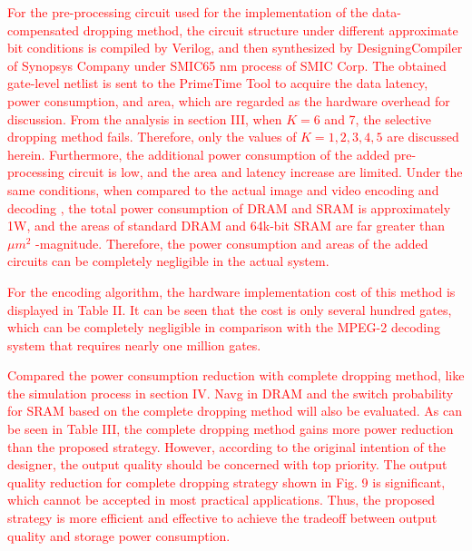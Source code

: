 \documentclass[lettersize,journal]{IEEEtran}
\begin{document}
\textcolor{red}{For the pre-processing circuit used for the implementation of the data-compensated dropping method, the circuit structure under different approximate bit conditions is compiled by Verilog, and then synthesized by DesigningCompiler of Synopsys Company under SMIC65 nm process of SMIC Corp. The obtained gate-level netlist is sent to the PrimeTime Tool to acquire the data latency, power consumption, and area, which are regarded as the hardware overhead for discussion. From the analysis in section III, when $K=6$ and 7, the selective dropping method fails. Therefore, only the values of $K= 1,2,3,4,5$ are discussed herein. Furthermore, the additional power consumption of the added pre-processing circuit is low, and the area and latency increase are limited. Under the same conditions, when compared to the actual image and video encoding and decoding \cite{4342716}, the total power consumption of DRAM and SRAM is approximately 1W, and the areas of standard DRAM and 64k-bit SRAM are far greater than $\mu m^{2}$ -magnitude. Therefore, the power consumption and areas of the added circuits can be completely negligible in the actual system.}

\textcolor{red}{For the encoding algorithm, the hardware implementation cost of this method is displayed in Table II. It can be seen that the cost is only several hundred gates, which can be completely negligible in comparison with the MPEG-2 decoding system that requires nearly one million gates.}

\textcolor{red}{Compared the power consumption reduction with complete dropping method, like the simulation process in section IV. Navg in DRAM and the switch probability for SRAM based on the complete dropping method will also be evaluated. As can be seen in Table III, the complete dropping method gains more power reduction than the proposed strategy. However, according to the original intention of the designer, the output quality should be concerned with top priority. The output quality reduction for complete dropping strategy shown in Fig. 9 is significant, which cannot be accepted in most practical applications. Thus, the proposed strategy is more efficient and effective to achieve the tradeoff between output quality and storage power consumption.}
\end{document}
